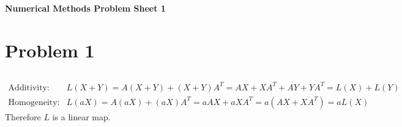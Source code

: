 \newcommand{\doctitle}{Numerical Methods Problem Sheet 1}



\begin{center}{\bfseries\Huge\doctitle}\end{center}

\section{Problem 1}
\subsection{}
$ \begin{array}{ll}
    \text{Additivity:} & L(X+Y) = A(X+Y)+(X+Y)A^T = AX+XA^T+AY+YA^T = L(X)+L(Y) \\
    \text{Homogeneity:} & L(aX) = A(aX)+(aX)A^T = aAX+aXA^T = a(AX+XA^T) = aL(X)
\end{array}$ \\

Therefore $L$ is a linear map.

\subsection{}

\subsection{}


\subsection{}

\subsection{}

\subsection{}

\subsection{}

\subsection{}

